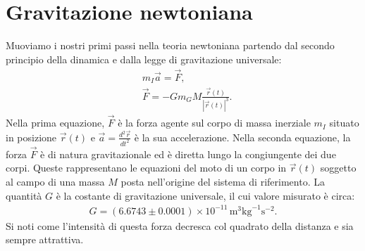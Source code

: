 \section{Gravitazione newtoniana}
Muoviamo i nostri primi passi nella teoria newtoniana partendo dal secondo principio della dinamica e dalla legge di gravitazione universale:
\begin{equation}
	\begin{split}
    	&m_I \vec{a} = \vec{F} \label{eq:inertial_mass_motion_law}, \\
    	&\vec{F} = - G m_G M \frac{\vec{r}(t)}{|\vec{r}(t)|^3}.
	\end{split}
\end{equation}
Nella prima equazione, $\vec{F}$ è la forza agente sul corpo di massa inerziale $m_I$ situato in posizione $\vec{r}(t)$ e $\vec{a} = \frac{d^2\vec{r}}{dt^2}$ è la sua accelerazione. Nella seconda equazione, la forza $\vec{F}$ è di natura gravitazionale ed è diretta lungo la congiungente dei due corpi. Queste rappresentano le equazioni del moto di un corpo in $\vec{r}(t)$ soggetto al campo di una massa $M$ posta nell'origine del sistema di riferimento. La quantità $G$ è la costante di gravitazione universale, il cui valore misurato è circa:
\begin{align}
    G = (6.6743 \pm 0.0001) \times 10^{-11} \, \text{m}^3 \text{kg}^{-1} \text{s}^{-2}.\end{align}
Si noti come l'intensità di questa forza decresca col quadrato della distanza e sia sempre attrattiva.

